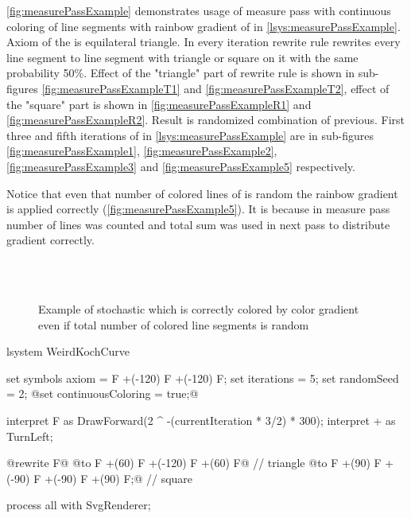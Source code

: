 \autoref{fig:measurePassExample} demonstrates usage of measure pass with continuous coloring of line segments with rainbow gradient of \lsystem in \autoref{lsys:measurePassExample}.
Axiom of the \lsystem is equilateral triangle.
In every iteration rewrite rule rewrites every line segment to line segment with triangle or square on it with the same probability 50\%.
Effect of the "triangle" part of rewrite rule is shown in sub-figures \ref{fig:measurePassExampleT1} and \ref{fig:measurePassExampleT2},
	effect of the "square" part is shown in \ref{fig:measurePassExampleR1} and \ref{fig:measurePassExampleR2}.
Result is randomized combination of previous.
First three and fifth iterations of \lsystem in \autoref{lsys:measurePassExample} are in sub-figures \ref{fig:measurePassExample1}, \ref{fig:measurePassExample2}, \ref{fig:measurePassExample3} and \ref{fig:measurePassExample5} respectively.

Notice that even that number of colored lines of \lsystem is random the rainbow gradient is applied correctly (\autoref{fig:measurePassExample5}).
It is because in measure pass number of lines was counted and total sum was used in next pass to distribute gradient correctly.

\begin{figure}[p]
	\centering
	 ~
	 ~
	 ~
	\\
	 ~
	 ~
	\\
	\caption{Example of stochastic \lsystem which is correctly colored by color gradient even if total number of colored line segments is random}
	\label{fig:measurePassExample}
\end{figure}

\begin{Lsystem}[label=lsys:measurePassExample,caption={Stochastic \lsystem with variable number of line segments}]
lsystem WeirdKochCurve {
	set symbols axiom = F +(-120) F +(-120) F;
	set iterations = 5;
	set randomSeed = 2;
	@set continuousColoring = true;@

	interpret F as DrawForward(2 ^ -(currentIteration * 3/2) * 300);
	interpret + as TurnLeft;

	@rewrite F@
		@to F +(60) F     +(-120)     F +(60) F@  // triangle
		@to F +(90) F +(-90) F +(-90) F +(90) F;@ // square
}
process all with SvgRenderer;
\end{Lsystem}


